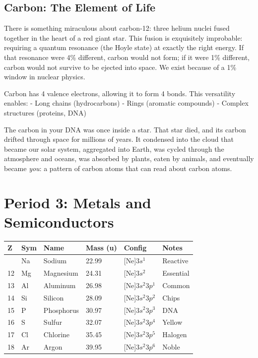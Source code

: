 \documentclass[
  11pt,
  letterpaper,
  twoside,
  openright]{book}
\begin{document}
\subsection{Carbon: The Element of
Life}\label{carbon-the-element-of-life}

There is something miraculous about carbon-12: three helium nuclei fused
together in the heart of a red giant star. This fusion is exquisitely
improbable: requiring a quantum resonance (the Hoyle state) at exactly
the right energy. If that resonance were 4\% different, carbon would not
form; if it were 1\% different, carbon would not survive to be ejected
into space. We exist because of a 1\% window in nuclear physics.

Carbon has 4 valence electrons, allowing it to form 4 bonds. This
versatility enables: - Long chains (hydrocarbons) - Rings (aromatic
compounds) - Complex structures (proteins, DNA)

The carbon in your DNA was once inside a star. That star died, and its
carbon drifted through space for millions of years. It condensed into
the cloud that became our solar system, aggregated into Earth, was
cycled through the atmosphere and oceans, was absorbed by plants, eaten
by animals, and eventually became \emph{you}: a pattern of carbon atoms
that can read about carbon atoms.

\section{Period 3: Metals and
Semiconductors}\label{period-3-metals-and-semiconductors}

\begin{longtable}[]{@{}llllll@{}}
\toprule\noalign{}
Z & Sym & Name & Mass (u) & Config & Notes \\
\midrule\noalign{}
\endhead
\bottomrule\noalign{}
\endlastfoot
11 & Na & Sodium & 22.99 & {[}Ne{]}\(3s^1\) & Reactive \\
12 & Mg & Magnesium & 24.31 & {[}Ne{]}\(3s^2\) & Essential \\
13 & Al & Aluminum & 26.98 & {[}Ne{]}\(3s^2 3p^1\) & Common \\
14 & Si & Silicon & 28.09 & {[}Ne{]}\(3s^2 3p^2\) & Chips \\
15 & P & Phosphorus & 30.97 & {[}Ne{]}\(3s^2 3p^3\) & DNA \\
16 & S & Sulfur & 32.07 & {[}Ne{]}\(3s^2 3p^4\) & Yellow \\
17 & Cl & Chlorine & 35.45 & {[}Ne{]}\(3s^2 3p^5\) & Halogen \\
18 & Ar & Argon & 39.95 & {[}Ne{]}\(3s^2 3p^6\) & Noble \\
\end{longtable}
\end{document}
